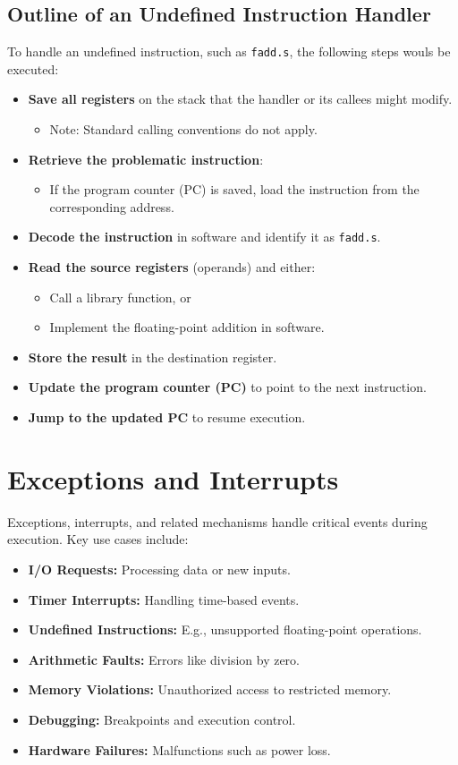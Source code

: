 \subsection{Outline of an Undefined Instruction Handler}
To handle an undefined instruction, such as \texttt{fadd.s}, the following steps wouls be executed:
\begin{itemize}
    \item[] \textbf{Save all registers} on the stack that the handler or its callees might modify.
    \begin{itemize}
        \item Note: Standard calling conventions do not apply.
    \end{itemize}
    \item[] \textbf{Retrieve the problematic instruction}:
    \begin{itemize}
        \item If the program counter (PC) is saved, load the instruction from the corresponding address.
    \end{itemize}
    \item[] \textbf{Decode the instruction} in software and identify it as \texttt{fadd.s}.
    \item[] \textbf{Read the source registers} (operands) and either:
    \begin{itemize}
        \item Call a library function, or
        \item Implement the floating-point addition in software.
    \end{itemize}
    \item[] \textbf{Store the result} in the destination register.
    \item[] \textbf{Update the program counter (PC)} to point to the next instruction.
    \item[] \textbf{Jump to the updated PC} to resume execution.
\end{itemize}

\section{Exceptions and Interrupts}
Exceptions, interrupts, and related mechanisms handle critical events during execution. Key use cases include:
\begin{itemize}
    \item[] \textbf{I/O Requests:} Processing data or new inputs.
    \item[] \textbf{Timer Interrupts:} Handling time-based events.
    \item[] \textbf{Undefined Instructions:} E.g., unsupported floating-point operations.
    \item[] \textbf{Arithmetic Faults:} Errors like division by zero.
    \item[] \textbf{Memory Violations:} Unauthorized access to restricted memory.
    \item[] \textbf{Debugging:} Breakpoints and execution control.
    \item[] \textbf{Hardware Failures:} Malfunctions such as power loss.
\end{itemize}

